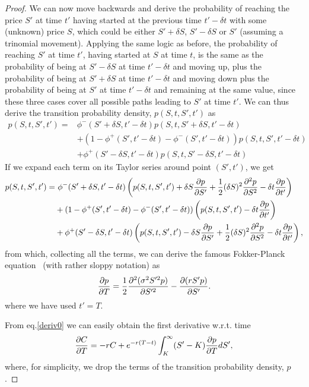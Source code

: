 \begin{proof}
We can now move backwards and derive the probability of reaching the price $S'$ at time $t'$ having started at the previous time $t'-\delta t$ with some (unknown) price $S$, which could be either $S'+\delta S$, $S'-\delta S$ or $S'$ (assuming a trinomial movement). Applying the same logic as before, the probability of reaching $S'$ at time $t'$, having started at $S$ at time $t$, is the same as the probability of being at $S'-\delta S$ at time $t'-\delta t$ and moving up, plus the probability of being at $S'+\delta S$ at time $t'-\delta t$ and moving down plus the probability of being at $S'$ at time $t'-\delta t$ and remaining at the same value, since these three cases cover all possible paths leading to $S'$ at time $t'$. We can thus derive the transition probability density, $ p(S,t,S',t')$ as
\begin{equation}
\begin{split}
p(S,t,S',t')=&\phi^-(S'+\delta S,t'-\delta t)p(S,t,S'+\delta S,t'-\delta t)\\
&+(1-\phi^+(S',t'-\delta t)-\phi^-(S',t'-\delta t))p(S,t,S',t'-\delta t)\\
&+\phi^+(S'-\delta S,t'-\delta t)p(S,t,S'-\delta S,t'-\delta t)
\end{split}
\end{equation}
\noindent If we expand each term on its Taylor series around point $(S',t')$, we get
\begin{equation}
\begin{split}
p(S,t,S',t')=&\ \phi^-(S'+\delta S,t'-\delta t)\left(p(S,t,S',t')+\delta S\pdv{p}{S'}+\frac{1}{2}(\delta S)^2\pdv{^2p}{S^2}-\delta t\pdv{p}{t'}\right)\\
&+(1-\phi^+(S',t'-\delta t)-\phi^-(S',t'-\delta t))\left(p(S,t,S',t')-\delta t\pdv{p}{t'}\right)\\
&+\phi^+(S'-\delta S,t'-\delta t)\left(p(S,t,S',t')-\delta S\pdv{p}{S'}+\frac{1}{2}(\delta S)^2\pdv{^2p}{S^2}-\delta t\pdv{p}{t'}\right),
\end{split}
\end{equation}
\noindent from which, collecting all the terms, we can derive the famous Fokker-Planck equation~\citep{Wilmott3} (with rather sloppy notation) as
\begin{equation}\label{FokkerPlanck}
\pdv{p}{T}=\frac{1}{2}\pdv{^2(\sigma^2S'^2p)}{S'^2}-\pdv{(rS'p)}{S'}.
\end{equation}
\noindent where we have used $t'=T$.


From eq.\eqref{deriv0} we can easily obtain the first derivative w.r.t. time
\begin{equation}
\pdv{C}{T}=-rC+e^{-r(T-t)}\int_K^\infty(S'-K)\pdv{p}{T}dS',
\end{equation}
\noindent where, for simplicity, we drop the terms of the transition probability density, $p$.


\end{proof}
